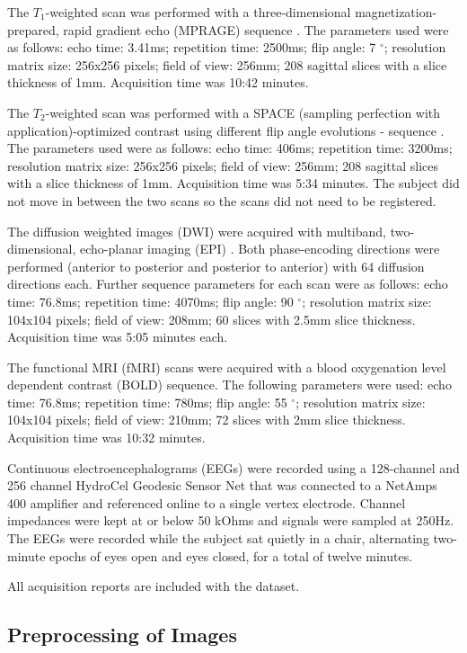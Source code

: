 The $T_1$-weighted scan was performed with a three-dimensional magnetization-prepared, rapid gradient echo (MPRAGE) sequence \cite{ref:mprage}. The parameters used were as follows: echo time: 3.41ms; repetition time: 2500ms; flip angle: 7 $^{\circ}$; resolution matrix size: 256x256 pixels; field of view: 256mm; 208 sagittal slices with a slice thickness of 1mm. Acquisition time was 10:42 minutes.

The $T_2$-weighted scan was performed with a SPACE (sampling perfection with application)-optimized contrast using different flip angle evolutions - sequence \cite{ref:space}. The parameters used were as follows: echo time: 406ms; repetition time: 3200ms; resolution matrix size: 256x256 pixels; field of view: 256mm; 208 sagittal slices with a slice thickness of 1mm. Acquisition time was 5:34 minutes. The subject did not move in between the two scans so the scans did not need to be registered.

The diffusion weighted images (DWI) were acquired with multiband, two-dimensional, echo-planar imaging (EPI) \cite{ref:epi}. Both phase-encoding directions were performed (anterior to posterior and posterior to anterior) with 64 diffusion directions each. Further sequence parameters for each scan were as follows: echo time: 76.8ms; repetition time: 4070ms; flip angle: 90 $^{\circ}$; resolution matrix size: 104x104 pixels; field of view: 208mm; 60 slices with 2.5mm slice thickness. Acquisition time was 5:05 minutes each.

The functional MRI (fMRI) scans were acquired with a blood oxygenation level dependent contrast (BOLD) sequence. The following parameters were used: echo time: 76.8ms; repetition time: 780ms; flip angle: 55 $^{\circ}$; resolution matrix size: 104x104 pixels; field of view: 210mm; 72 slices with 2mm slice thickness. Acquisition time was 10:32 minutes.

Continuous electroencephalograms (EEGs) were recorded using a 128-channel and 256 channel HydroCel Geodesic Sensor Net that was connected to a NetAmps 400 amplifier and referenced online to a single vertex electrode. Channel impedances were kept at or below 50 kOhms and signals were sampled at 250Hz. The EEGs were recorded while the subject sat quietly in a chair, alternating two-minute epochs of eyes open and eyes closed, for a total of twelve minutes.

All acquisition reports are included with the dataset.

\subsection{Preprocessing of Images}
\label{sec:preprocess}

